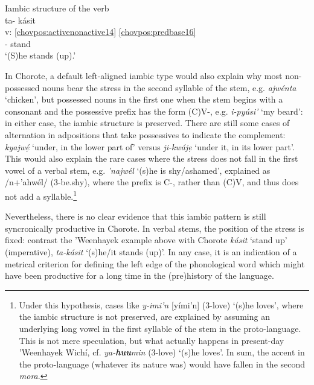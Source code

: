 \documentclass[output=paper]{langscibook}
\begin{document}
\ea\label{bkm:Ref85989483} Iambic structure of the verb\\ 
\glll {} ta- kásit\\
    v: \ref{chovpos:activenonactive14} \ref{chovpos:predbase16}\\ 
    {} \Third{}- stand\\ 
\glt `(S)he stands (up).'
\z 

In Chorote, a default left-aligned iambic type would also explain why most non-possessed nouns bear the stress in the second syllable of the stem, e.g. \textit{ajwén\-ta} `chicken', but possessed nouns in the first one when the stem begins with a consonant and the possessive prefix has the form (C)V-, e.g. \textit{i-pyúsi'} `my beard': in either case, the iambic structure is preserved. There are still some cases of alternation in adpositions that take possessives to indicate the complement: \textit{kyajwẹ́} `under, in the lower part of' versus \textit{ji-kwájẹ} `under it, in its lower part'. This would also explain the rare cases where the stress does not fall in the first vowel of a verbal stem, e.g. \textit{'najwél} `(s)he is shy/ashamed', explained as /n+'ahwél/ (3-be.shy), where the prefix is C-, rather than (C)V, and thus does not add a syllable.\footnote{Under this hypothesis, cases like \textit{y-imi'n} [yími'n] (3-love) `(s)he loves', where the iambic structure is not preserved, are explained by assuming an underlying long vowel in the first syllable of the stem in the proto-language. This is not mere speculation, but what actually happens in present-day 'Weenhayek Wichí, cf. \textit{ya-}\textbf{\textit{huu}}\textit{min} (3-love) `(s)he loves'. In sum, the accent in the proto-language (whatever its nature was) would have fallen in the second \textit{mora}.}

Nevertheless, there is no clear evidence that this iambic pattern is still syncronically productive in Chorote. In verbal stems, the position of the stress is fixed: contrast the 'Weenhayek example above with Chorote \textit{kásit} `stand up' (imperative), \textit{ta-kásit} `(s)he/it stands (up)'. In any case, it is an indication of a metrical criterion for defining the left edge of the phonological word which might have been productive for a long time in the (pre)history of the language.
\end{document}
